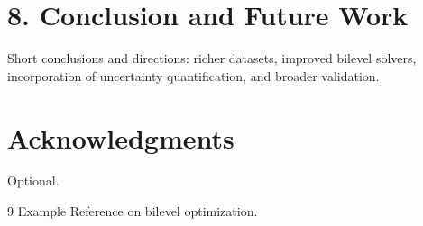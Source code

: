 \documentclass[twocolumn,10pt]{article}
\begin{document}
\section*{8. Conclusion and Future Work}
Short conclusions and directions: richer datasets, improved bilevel solvers, incorporation of uncertainty quantification, and broader validation.

\section*{Acknowledgments}
Optional.

\begin{thebibliography}{9}
 Example Reference on bilevel optimization.
\end{thebibliography}
\end{document}
